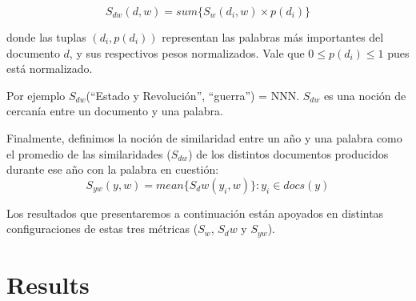 \documentclass{pnastwo}
\begin{document}
\begin{article}
\begin{equation}
S_{dw}(d, w) = sum \{ S_w(d_i, w) \times p(d_i)  \} 
\end{equation}

donde las tuplas $(d_i , p(d_i))$ representan las palabras más importantes del documento $d$, y sus respectivos pesos normalizados. Vale que $0 \leq p(d_i) \leq 1$ pues está normalizado.

Por ejemplo $S_{dw}$(“Estado y Revolución”, “guerra”) = NNN. $S_{dw}$ es una noción de cercanía entre un documento y una palabra.

Finalmente, definimos la noción de similaridad entre un año y una palabra como el promedio de las similaridades ($S_{dw}$) 
de los distintos documentos producidos durante ese año con la palabra en cuestión:
\begin{equation}
  S_{yw}(y, w) = mean \{ S_dw(y_i, w) \} : y_i \in docs(y) 
\end{equation}

Los resultados que presentaremos a continuaci\'on est\'an apoyados en distintas configuraciones de estas tres m\'etricas ($S_w$, $S_dw$ y $S_{yw}$).

% 

\section{Results}

\end{article}
\end{document}
